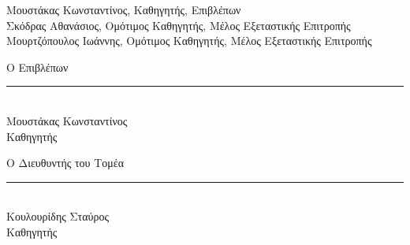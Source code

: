 \begin{center}
  Μουστάκας Κωνσταντίνος, Καθηγητής, Επιβλέπων\\[0.3em]
  Σκόδρας Αθανάσιος, Ομότιμος Καθηγητής, Μέλος Εξεταστικής Επιτροπής\\[0.3em]
  Μουρτζόπουλος Ιωάννης, Ομότιμος Καθηγητής, Μέλος Εξεταστικής Επιτροπής
\end{center}

\vspace{1.2cm}

\noindent
\begin{minipage}[t]{0.46\linewidth}
  Ο Επιβλέπων\\[1.6cm]
  \rule{5.5cm}{0.4pt}\\[0.4em]
  Μουστάκας Κωνσταντίνος\\
  Καθηγητής
\end{minipage}%
\hfill
\begin{minipage}[t]{0.46\linewidth}
  Ο Διευθυντής του Τομέα\\[1.6cm]
  \rule{5.5cm}{0.4pt}\\[0.4em]
  Κουλουρίδης Σταύρος\\
  Καθηγητής
\end{minipage}


\cleardoublepage

